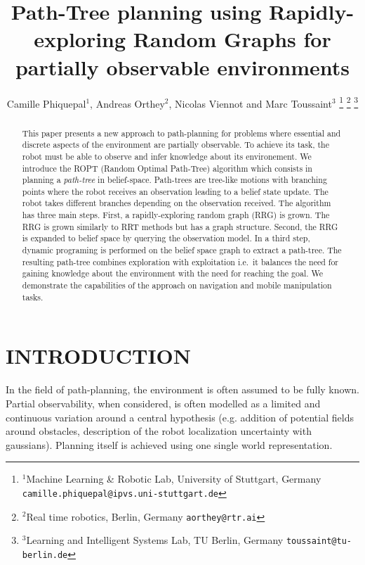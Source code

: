 \documentclass[letterpaper, 10 pt, conference]{ieeeconf}  %
\title{\LARGE \bf
Path-Tree planning using Rapidly-exploring Random Graphs for partially observable environments
}
\author{Camille Phiquepal$^{1}$, Andreas Orthey$^{2}$, Nicolas Viennot and Marc Toussaint$^{3}$
\thanks{$^{1}$Machine Learning \& Robotic Lab, University of Stuttgart, Germany
        {\tt\small camille.phiquepal@ipvs.uni-stuttgart.de}}
\thanks{$^{2}$Real time robotics, Berlin, Germany
        {\tt\small aorthey@rtr.ai}}
\thanks{$^{3}$Learning and Intelligent Systems Lab, TU Berlin, Germany
        {\tt\small toussaint@tu-berlin.de}}
}
\begin{document}
\maketitle
\thispagestyle{empty}
\pagestyle{empty}


\begin{abstract}
This paper presents a new approach to path-planning for problems where essential and discrete aspects of the environment are partially observable.
To achieve its task, the robot must be able to observe and infer knowledge about its environement.
We introduce the ROPT (Random Optimal Path-Tree) algorithm which consists in planning a \textit{path-tree} in belief-space. Path-trees are tree-like motions with branching points where the robot receives an observation leading to a belief state update. The robot takes different branches depending on the observation received.
The algorithm has three main steps. First, a rapidly-exploring random graph (RRG) is grown. The RRG is grown similarly to RRT methods but has a graph structure. Second, the RRG is expanded to belief space by querying the observation model. In a third step, dynamic programing is performed on the belief space graph to extract a path-tree. The resulting path-tree combines exploration with exploitation i.e.\ it balances the need for gaining knowledge about the environment with the need for reaching the goal. We demonstrate the capabilities of the approach on navigation and mobile manipulation tasks.
\end{abstract}


\section{INTRODUCTION}
In the field of path-planning, the environment is often assumed to be fully known. Partial observability, when considered, is often modelled as a limited and continuous variation around a central hypothesis  (e.g. addition of potential fields around obstacles, description of the robot localization uncertainty with gaussians). Planning itself is achieved using one single world representation.
\end{document}
